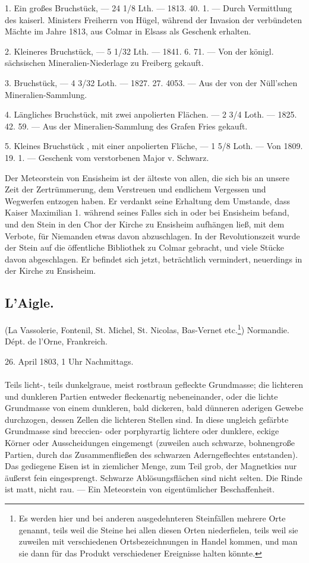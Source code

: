 \documentclass[a4paper, 11pt, oneside, polutonikogreek, german]{article}
\begin{document}
1. Ein großes Bruchstück, — 24 1/8 Lth. — 1813. 40. 1. — Durch Vermittlung des kaiserl. Ministers Freiherrn von Hügel, während der Invasion der verbündeten Mächte im Jahre 1813, aus Colmar in Elsass als Geschenk erhalten.

2. Kleineres Bruchstück, — 5 1/32 Lth. — 1841. 6. 71. — Von der königl. sächsischen Mineralien-Niederlage zu Freiberg gekauft.

3. Bruchstück, — 4 3/32 Loth. — 1827. 27. 4053.
— Aus der von der Nüll’schen Mineralien-Sammlung.

4. Längliches Bruchstück, mit zwei anpolierten Flächen. — 2 3/4 Loth. — 1825. 42. 59. — Aus der Mineralien-Sammlung des Grafen Fries gekauft.

5. Kleines Bruchstück , mit einer anpolierten Fläche, — 1 5/8 Loth. — Von 1809. 19. 1. — Geschenk vom verstorbenen Major v. Schwarz.

Der Meteorstein von Ensisheim ist der älteste von allen, die sich bis an unsere Zeit der Zertrümmerung, dem Verstreuen und endlichem Vergessen und Wegwerfen entzogen haben. Er verdankt seine Erhaltung dem Umstande, dass Kaiser Maximilian 1. während seines Falles sich in oder bei Ensisheim befand, und den Stein in den Chor der Kirche zu Ensisheim aufhängen ließ, mit dem Verbote, für Niemanden etwas davon abzuschlagen. In der Revolutionszeit wurde der Stein auf die öffentliche Bibliothek zu Colmar gebracht, und viele Stücke davon abgeschlagen. Er befindet sich jetzt, beträchtlich vermindert, neuerdings in der Kirche zu Ensisheim.
\subsection{L'Aigle.}
\begin{center}
\small
(La Vassolerie, Fontenil, St. Michel, St. Nicolas, Bas-Vernet etc.\footnote{Es werden hier und bei anderen ausgedehnteren Steinfällen mehrere Orte genannt, teils weil die Steine hei allen diesen Orten niederfielen, teils weil sie zuweilen mit verschiedenen Ortsbezeichnungen in Handel kommen, und man sie dann für das Produkt verschiedener Ereignisse halten könnte.}) Normandie. Dépt. de l'Orne, Frankreich.

26. April 1803, 1 Uhr Nachmittags.
\end{center}
\paragraph{}
Teils licht-, teils dunkelgraue, meist rostbraun gefleckte Grundmasse; die lichteren und dunkleren Partien entweder fleckenartig nebeneinander, oder die lichte Grundmasse von einem dunkleren, bald dickeren, bald dünneren aderigen Gewebe durchzogen, dessen Zellen die lichteren Stellen sind. In diese ungleich gefärbte Grundmasse sind breccien- oder porphyrartig lichtere oder dunklere, eckige Körner oder Ausscheidungen eingemengt (zuweilen auch schwarze, bohnengroße Partien, durch das Zusammenfließen des schwarzen Aderngeflechtes entstanden). Das gediegene Eisen ist in ziemlicher Menge, zum Teil grob, der Magnetkies nur äußerst fein eingesprengt. Schwarze Ablösungsflächen sind nicht selten. Die Rinde ist matt, nicht rau. — Ein Meteorstein von eigentümlicher Beschaffenheit.
\end{document}
